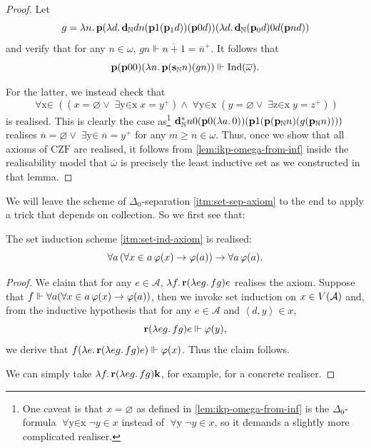 \documentclass[12pt,openany]{book}
\theoremstyle{plain}
\theoremstyle{definition}
\newcommand\tuple[1]{\left\langle #1 \right\rangle}
\newcommand\opA[1]{\mathop{\forall #1}}
\newcommand\opE[1]{\mathop{\exists #1}}
\newcommand\oplam[1]{\mathop{\lambda #1.}}
\DeclareMathOperator\Ind{Ind}
\newcommand\CZF{\mathrm{CZF}}
\newcommand\bk{\mathbf{k}}
\newcommand\bp{\mathbf{p}}
\newcommand\br{\mathbf{r}}
\newcommand\bsN{\mathbf{s}_\mathbb{N}}
\newcommand\bpN{\mathbf{p}_\mathbb{N}}
\newcommand\bdN{\mathbf{d}_\mathbb{N}}
\begin{document}
\begin{proof}
  Let
  \[g = \oplam{n} \bp \mleft(\oplam{d} \bdN dn \mleft(\bp 1 \mleft(\bp_1 d\mright)\mright) \mleft(\bp 0 d\mright)\mright) \mleft(\oplam{d} \bdN \mleft(\bp_0 d\mright) 0d \mleft(\bp nd\mright)\mright)\]
  and verify that for any $n \in \omega$, $gn \Vdash \overline{n + 1} = \overline{n}^+$. It follows that
  \[\bp \mleft(\bp 00\mright) \mleft(\oplam{n} \bp \mleft(\bsN n\mright) \mleft(gn\mright)\mright) \Vdash \Ind\mleft(\overline{\omega}\mright).\]

  For the latter, we instead check that
  \[\opA{x \in \overline{\omega}} \left(\left(x = \varnothing \lor \opE{y \in x} x = y^+\right) \land \opA{y \in x} \left(y = \varnothing \lor \opE{z \in x} y = z^+\right)\right)\]
  is realised. This is clearly the case as\footnote{One caveat is that $x = \varnothing$ as defined in \autoref{lem:ikp-omega-from-inf} is the $\Delta_0$-formula $\opA{y \in x} \neg y \in x$ instead of $\opA{y} \neg y \in x$, so it demands a slightly more complicated realiser.} $\bdN^* n0 \mleft(\bp 0 \mleft(\oplam{a} 0\mright)\mright) \mleft(\bp 1 \mleft(\bp \mleft(\bpN n\mright) \mleft(g \mleft(\bpN n\mright)\mright)\mright)\mright)$ realises $\overline{n} = \varnothing \lor \opE{y \in \overline{m}} \overline{n} = y^+$ for any $m \geq n \in \omega$. Thus, once we show that all axioms of $\CZF$ are realised, it follows from \autoref{lem:ikp-omega-from-inf} inside the realisability model that $\overline{\omega}$ is precisely the least inductive set as we constructed in that lemma.
\end{proof}

We will leave the scheme of $\Delta_0$-separation \ref{itm:set-sep-axiom} to the end to apply a trick that depends on collection. So we first see that:
\begin{lemma}
  \label{lem:czf-real-set-ind}
  The set induction scheme \ref{itm:set-ind-axiom} is realised:
  \[\opA{a} \left(\opA{x \in a} \varphi\mleft(x\mright) \rightarrow \varphi\mleft(a\mright)\right) \rightarrow \opA{a} \varphi\mleft(a\mright).\]
\end{lemma}

\begin{proof}
  We claim that for any $e \in \mathcal{A}$, $\oplam{f} \br \mleft(\oplam{eg} fg\mright) e$ realises the axiom. Suppose that $f \Vdash \opA{a} \mleft(\opA{x \in a} \varphi\mleft(x\mright) \rightarrow \varphi\mleft(a\mright)\mright)$, then we invoke set induction on $x \in V\mleft(\mathcal{A}\mright)$ and, from the inductive hypothesis that for any $e \in \mathcal{A}$ and $\tuple{d, y} \in x$,
  \[\br \mleft(\oplam{eg} fg\mright) e \Vdash \varphi\mleft(y\mright),\]
  we derive that $f \mleft(\oplam{e} \br \mleft(\oplam{eg} fg\mright) e\mright) \Vdash \varphi\mleft(x\mright)$. Thus the claim follows.

  We can simply take $\oplam{f} \br \mleft(\oplam{eg} fg\mright) \bk$, for example, for a concrete realiser.
\end{proof}
\end{document}
